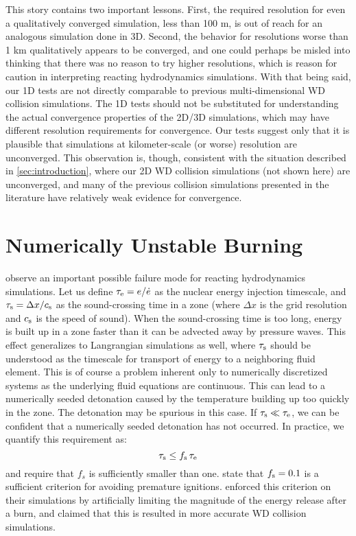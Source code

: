 \documentclass[twocolumn,numberedappendix,trackchanges]{../aastex62}
\begin{document}
This story contains two important lessons. First, the required resolution for even a qualitatively converged
simulation, less than 100 m, is out of reach for an analogous simulation done in 3D. Second, the behavior for 
resolutions worse than 1 km qualitatively appears to be converged, and one could perhaps be misled into
thinking that there was no reason to try higher resolutions, which is reason for caution in interpreting
reacting hydrodynamics simulations. With that being said, our 1D tests are not directly comparable to
previous multi-dimensional WD collision simulations. The 1D tests should not be substituted for understanding the
actual convergence properties of the 2D/3D simulations, which may have different resolution requirements for
convergence. Our tests suggest only that it is plausible that simulations at kilometer-scale (or worse) resolution
are unconverged. This observation is, though, consistent with the situation described in \autoref{sec:introduction},
where our 2D WD collision simulations (not shown here) are unconverged, and many of the previous collision simulations
presented in the literature have relatively weak evidence for convergence.



\section{Numerically Unstable Burning}
\label{sec:unstable_burning}

\citet{kushnir:2013} observe an important possible failure mode
for reacting hydrodynamics simulations. Let us define $\tau_{\rm e} = e / \dot{e}$
as the nuclear energy injection timescale, and $\tau_{\rm s} = \Delta x / c_{\rm s}$
as the sound-crossing time in a zone (where $\Delta x$ is the grid
resolution and $c_{\rm s}$ is the speed of sound). When the sound-crossing
time is too long, energy is built up in a zone faster than it can be
advected away by pressure waves. This effect generalizes to
Langrangian simulations as well, where $\tau_{\rm s}$ should be understood
as the timescale for transport of energy to a neighboring fluid element.
This is of course a problem inherent 
only to numerically discretized systems as the underlying fluid equations
are continuous. This can lead to a numerically seeded detonation
caused by the temperature building up too quickly in the zone. The
detonation may be spurious in this case. If $\tau_{\rm s} \ll \tau_{\rm e}$,
we can be confident that a numerically seeded detonation has not
occurred. In practice, we quantify this requirement as:
\begin{equation}
  \tau_{\rm s} \leq f_{\rm s}\, \tau_{\rm e} \label{eq:burning_limiter}
\end{equation}
and require that $f_{s}$ is sufficiently smaller than one.
\citet{kushnir:2013} state that $f_{\rm s} = 0.1$ is a sufficient
criterion for avoiding premature ignitions. \citeauthor{kushnir:2013}
enforced this criterion on their simulations by artificially limiting
the magnitude of the energy release after a burn, and claimed that
this is resulted in more accurate WD collision simulations.
\end{document}
